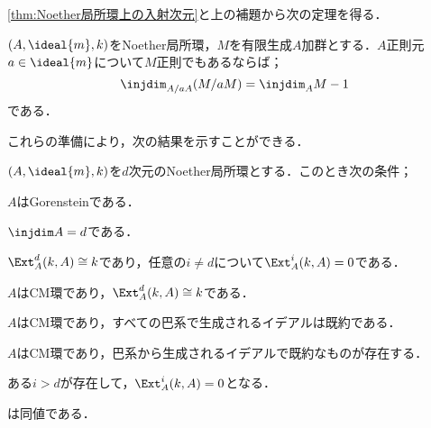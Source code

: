 \ref{thm:Noether局所環上の入射次元}と上の補題から次の定理を得る．
\begin{thm}\label{thm:injdim A/aA=injdim A-1}
	$(A,\ideal{m},k)$をNoether局所環，$M$を有限生成$A$加群とする．$A$正則元$a\in\ideal{m}$について$M$正則でもあるならば；
	\[\injdim_{A/aA}(M/aM)=\injdim_A M-1\]
	である．
\end{thm}
%

これらの準備により，次の結果を示すことができる．

\begin{thm}[Gorenstein環の特徴づけ]\label{thm:Gorensteinの特徴づけ}
	$(A,\ideal{m},k)$を$d$次元のNoether局所環とする．このとき次の条件；
	\begin{sakura}
		\item $A$はGorensteinである．
		\item $\injdim A=d$である．
		\item $\Ext^d_A(k,A)\cong k$であり，任意の$i\neq d$について$\Ext^i_A(k,A)=0$である．
		\item $A$はCM環であり，$\Ext^d_A(k,A)\cong k$である．
		\item $A$はCM環であり，すべての巴系で生成されるイデアルは既約である．
		\item $A$はCM環であり，巴系から生成されるイデアルで既約なものが存在する．
		\item ある$i>d$が存在して，$\Ext^i_A(k,A)=0$となる．
	\end{sakura}
	は同値である．
\end{thm}

